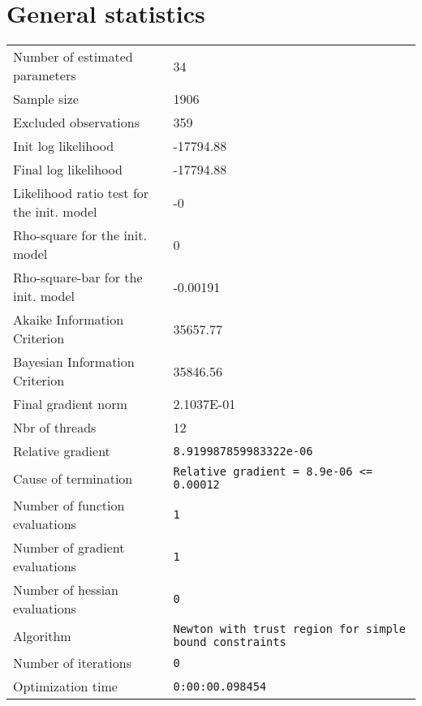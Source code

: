 



\section{General statistics}
\begin{tabular}{ll}
Number of estimated parameters & 34 \\
Sample size & 1906 \\
Excluded observations & 359 \\
Init log likelihood & -17794.88 \\
Final log likelihood & -17794.88 \\
Likelihood ratio test for the init. model & -0 \\
Rho-square for the init. model & 0 \\
Rho-square-bar for the init. model & -0.00191 \\
Akaike Information Criterion & 35657.77 \\
Bayesian Information Criterion & 35846.56 \\
Final gradient norm & 2.1037E-01 \\
Nbr of threads & 12 \\
Relative gradient & \verb$8.919987859983322e-06$ \\
Cause of termination & \verb$Relative gradient = 8.9e-06 <= 0.00012$ \\
Number of function evaluations & \verb$1$ \\
Number of gradient evaluations & \verb$1$ \\
Number of hessian evaluations & \verb$0$ \\
Algorithm & \verb$Newton with trust region for simple bound constraints$ \\
Number of iterations & \verb$0$ \\
Optimization time & \verb$0:00:00.098454$ \\
\end{tabular}

